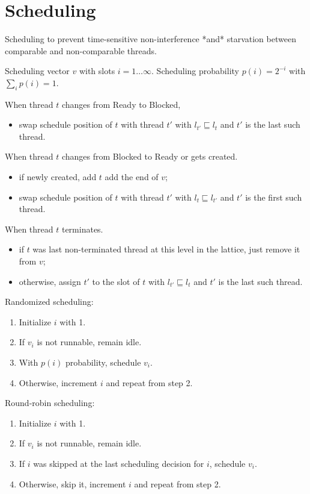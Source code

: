 \documentclass[10pt,preprint]{sigplanconf}
\begin{document}
\section{Scheduling}

Scheduling to prevent time-sensitive non-interference *and* starvation between comparable and non-comparable threads.

Scheduling vector $v$ with slots $i=1 \ldots \infty$.  Scheduling probability $p(i) = 2^{-i}$ with $\sum_i p(i) = 1$.

When thread $t$ changes from Ready to Blocked,

\begin{itemize}
  \item swap schedule position of $t$ with thread $t'$ with $l_{t'} \sqsubseteq l_t$ and $t'$ is the last such thread.
\end{itemize}

When thread $t$ changes from Blocked to Ready or gets created.

\begin{itemize}
  \item if newly created, add $t$ add the end of $v$;
  \item swap schedule position of $t$ with thread $t'$ with $l_{t} \sqsubseteq l_{t'}$ and $t'$ is the first such thread.
\end{itemize}

When thread $t$ terminates.

\begin{itemize}
  \item if $t$ was last non-terminated thread at this level in the lattice, just remove it from $v$;
  \item otherwise, assign $t'$ to the slot of $t$ with $l_{t'} \sqsubseteq l_t$ and $t'$ is the last such thread.
\end{itemize}

Randomized scheduling:

\begin{enumerate}
  \item Initialize $i$ with 1.
  \item If $v_i$ is not runnable, remain idle.
  \item With $p(i)$ probability, schedule $v_i$.
  \item Otherwise, increment $i$ and repeat from step 2.
\end{enumerate}

Round-robin scheduling:

\begin{enumerate}
  \item Initialize $i$ with 1.
  \item If $v_i$ is not runnable, remain idle.
  \item If $i$ was skipped at the last scheduling decision for $i$, schedule $v_i$.
  \item Otherwise, skip it, increment $i$ and repeat from step 2.
\end{enumerate}
\end{document}
